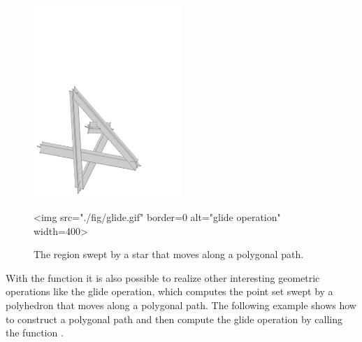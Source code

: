 \begin{figure}
  \begin{center}
    \begin{ccTexOnly}
      \includegraphics[width=0.5\textwidth]{Minkowski_sum_3/fig/glide}

  \end{ccTexOnly}
  \begin{ccHtmlOnly}
    <img src="./fig/glide.gif" border=0 alt="glide operation" width=400>
  \end{ccHtmlOnly}
    \end{center}
  \caption{The region swept by a star that moves along a polygonal path.}
\end{figure}

With the function  it is also possible to realize
other interesting geometric operations like the glide operation, which
computes the point set swept by a polyhedron that moves along a
polygonal path. The following example shows how to construct a
polygonal path and then compute the glide operation by calling the
function .

